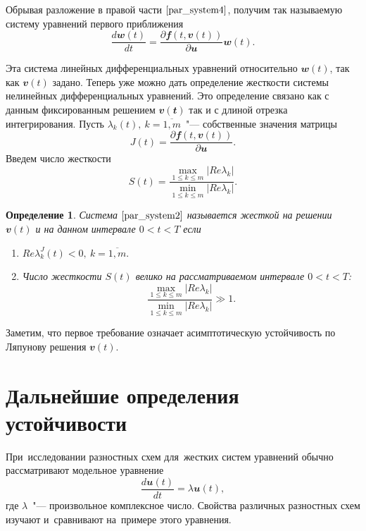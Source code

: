 \documentclass[11pt,a4paper,twoside]{report}
\numberwithin{equation}{section}
\newtheorem*{definition}{Определение}
\theoremstyle{definition}
\theoremstyle{plain}
\newcommand{\vfunc}[1]{\mathbfit{#1}}
\begin{document}
Обрывая разложение в правой части $\eqref{par_system4}$, получим
так называемую систему уравнений первого приближения
%
\begin{equation}
%
    \label{par_system5}
    \dfrac{d\vfunc{w}(t)}{dt} = \dfrac{\partial
    \vfunc{f}(t,\vfunc{v}(t))}{\partial \vfunc{u}}\vfunc{w}(t).
%
\end{equation}
%

Эта система линейных дифференциальных уравнений относительно $\vfunc{w}(t)$,
так как $\vfunc{v}(t)$ задано. Теперь уже можно дать определение жесткости
системы нелинейных дифференциальных уравнений. Это определение связано как
с данным фиксированным решением $\vfunc{v(t)}$ так и с длиной отрезка
интегрирования. Пусть $\lambda_k(t),~k=\overline{1,m}$~"--- собственные
значения матрицы
%
$$
    J(t) = \dfrac{\partial \vfunc{f}(t,\vfunc{v}(t))}{\partial \vfunc{u}}.
$$
%
Введем число жесткости
%
$$
    S(t) = \dfrac{\max\limits_{1 \leqslant k \leqslant m}\left|Re\lambda_k\right|}
    {\min\limits_{1 \leqslant k \leqslant m}\left|Re\lambda_k\right|}.
$$
%
\begin{definition}
%
    Система $\eqref{par_system2}$ называется жесткой на решении $\vfunc{v}(t)$
    и на данном интервале $0<t<T$ если
    \begin{enumerate}
        \item
        $Re\lambda^J_k(t) < 0,~k=\overline{1,m}.$
        \item
        Число жесткости $S(t)$ велико на рассматриваемом интервале $0<t<T$:
        $$
            \dfrac{\max\limits_{1 \leqslant k \leqslant m}|Re\lambda_k|}
            {\min\limits_{1 \leqslant k \leqslant m}|Re\lambda_k|}\gg 1.
        $$
    \end{enumerate}
%
\end{definition}
%

Заметим, что первое требование означает асимптотическую устойчивость по
Ляпунову решения $\vfunc{v}(t)$.
%
\section{Дальнейшие определения устойчивости}
%
При~исследовании разностных схем для~жестких систем уравнений обычно
рассматривают модельное уравнение
%
\begin{equation}
    \label{model-eq}
    \dfrac{d\vfunc{u}(t)}{dt}=\lambda\vfunc{u}(t),
\end{equation}
%
где $\lambda$~"--- произвольное комплексное число. Свойства различных разностных
схем изучают и~сравнивают на~примере этого уравнения.
\end{document}
